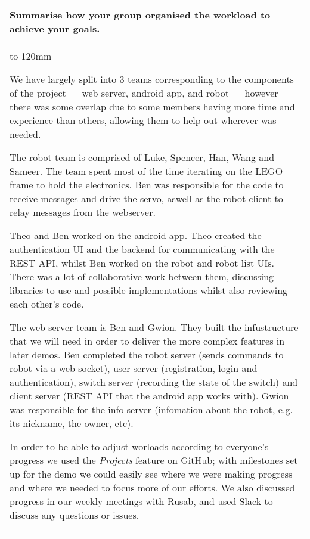 \documentclass[a4paper]{article}
\newcommand{\colWidth}{141mm}
\begin{document}
\begin{center}

\begin{tabular}{|p{\colWidth}|}
	\hline
	\cellcolor{blue!25}\large
	\textbf{Summarise how your group organised the workload to achieve your goals.}
	\\ \hline
	\vtop to 120mm{
		We have largely split into 3 teams corresponding to the components of the project --- web server, android app, and robot --- however there was some overlap due to some members having more time and experience than others, allowing them to help out wherever was needed.

		The robot team is comprised of Luke, Spencer, Han, Wang and Sameer. The team spent most of the time iterating on the LEGO frame to hold the electronics. Ben was responsible for the code to receive messages and drive the servo, aswell as the robot client to relay messages from the webserver. 

		Theo and Ben worked on the android app. Theo created the authentication UI and the backend for communicating with the REST API, whilst Ben worked on the robot and robot list UIs. There was a lot of collaborative work between them, discussing libraries to use and possible implementations whilst also reviewing each other's code. 

		The web server team is Ben and Gwion. They built the infustructure that we will need in order to deliver the more complex features in later demos. Ben completed the robot server (sends commands to robot via a web socket), user server (registration, login and authentication), switch server (recording the state of the switch) and client server (REST API that the android app works with). Gwion was responsible for the info server (infomation about the robot, e.g. its nickname, the owner, etc).

		In order to be able to adjust worloads according to everyone's progress we used the \textit{Projects} feature on GitHub; with milestones set up for the demo we could easily see where we were making progress and where we needed to focus more of our efforts.
		We also discussed progress in our weekly meetings with Rusab, and used Slack to discuss any questions or issues.
	}
  \\
  \hline
\end{tabular}
\vskip 5mm



\end{center}
\end{document}
